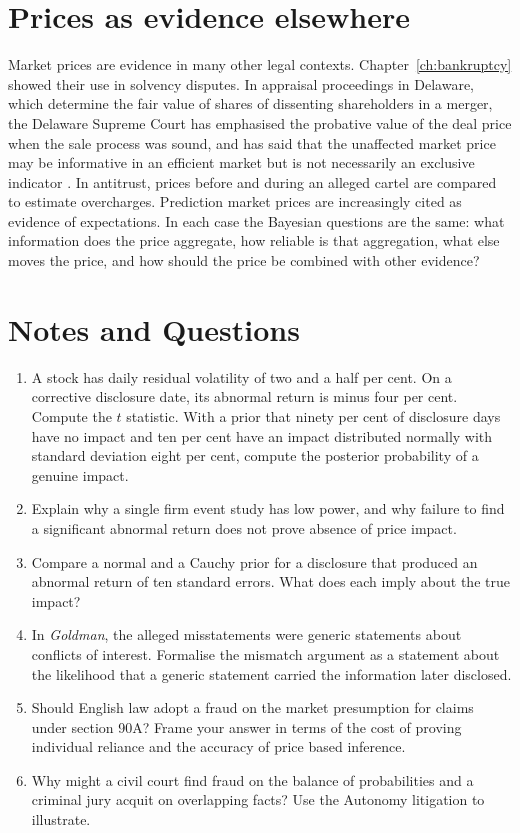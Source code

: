 \section{Prices as evidence elsewhere}

Market prices are evidence in many other legal contexts. Chapter~\ref{ch:bankruptcy} showed their use in solvency disputes. In appraisal proceedings in Delaware, which determine the fair value of shares of dissenting shareholders in a merger, the Delaware Supreme Court has emphasised the probative value of the deal price when the sale process was sound, and has said that the unaffected market price may be informative in an efficient market but is not necessarily an exclusive indicator \citep{aruba2019}. In antitrust, prices before and during an alleged cartel are compared to estimate overcharges. Prediction market prices are increasingly cited as evidence of expectations. In each case the Bayesian questions are the same: what information does the price aggregate, how reliable is that aggregation, what else moves the price, and how should the price be combined with other evidence?

\section*{Notes and Questions}
\begin{enumerate}[label=\arabic*.]
\item A stock has daily residual volatility of two and a half per cent. On a corrective disclosure date, its abnormal return is minus four per cent. Compute the $t$ statistic. With a prior that ninety per cent of disclosure days have no impact and ten per cent have an impact distributed normally with standard deviation eight per cent, compute the posterior probability of a genuine impact.
\item Explain why a single firm event study has low power, and why failure to find a significant abnormal return does not prove absence of price impact.
\item Compare a normal and a Cauchy prior for a disclosure that produced an abnormal return of ten standard errors. What does each imply about the true impact?
\item In \emph{Goldman}, the alleged misstatements were generic statements about conflicts of interest. Formalise the mismatch argument as a statement about the likelihood that a generic statement carried the information later disclosed.
\item Should English law adopt a fraud on the market presumption for claims under section 90A? Frame your answer in terms of the cost of proving individual reliance and the accuracy of price based inference.
\item Why might a civil court find fraud on the balance of probabilities and a criminal jury acquit on overlapping facts? Use the Autonomy litigation to illustrate.
\end{enumerate}


